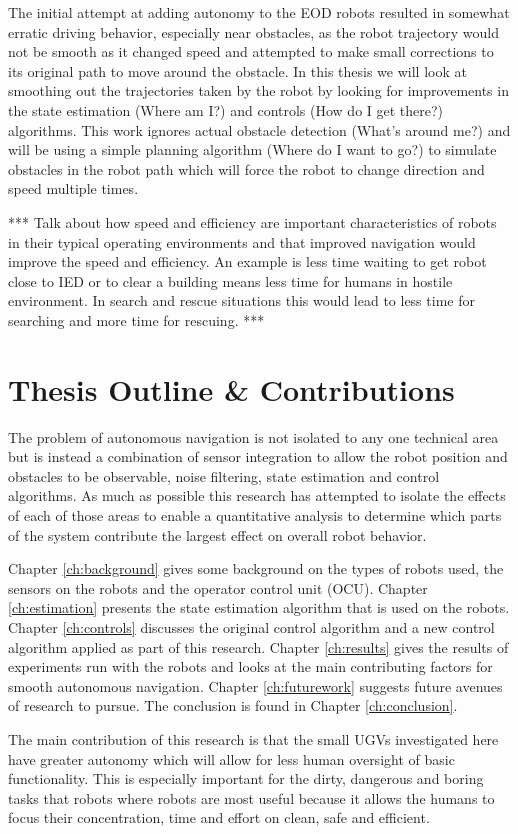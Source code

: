 The initial attempt at adding autonomy to the EOD robots resulted in somewhat erratic driving behavior, especially near obstacles, as the robot trajectory would not be smooth as it changed speed and attempted to make small corrections to its original path to move around the obstacle. In this thesis we will look at smoothing out the trajectories taken by the robot by looking for improvements in the state estimation (Where am I?) and controls (How do I get there?) algorithms. This work ignores actual obstacle detection (What's around me?) and will be using a simple planning algorithm (Where do I want to go?) to simulate obstacles in the robot path which will force the robot to change direction and speed multiple times.

*** Talk about how speed and efficiency are important characteristics of robots in their typical operating environments and that improved navigation would improve the speed and efficiency. An example is less time waiting to get robot close to IED or to clear a building means less time for humans in hostile environment. In search and rescue situations this would lead to less time for searching and more time for rescuing. ***

\section{Thesis Outline \& Contributions}
\label{sec:outline}
The problem of autonomous navigation is not isolated to any one technical area but is instead a combination of sensor integration to allow the robot position and obstacles to be observable, noise filtering, state estimation and control algorithms. As much as possible this research has attempted to isolate the effects of each of those areas to enable a quantitative analysis to determine which parts of the system contribute the largest effect on overall robot behavior.

Chapter \ref{ch:background} gives some background on the types of robots used, the sensors on the robots and the operator control unit (OCU). Chapter \ref{ch:estimation} presents the state estimation algorithm that is used on the robots. Chapter \ref{ch:controls} discusses the original control algorithm and a new control algorithm applied as part of this research. Chapter \ref{ch:results} gives the results of experiments run with the robots and looks at the main contributing factors for smooth autonomous navigation. Chapter \ref{ch:futurework} suggests future avenues of research to pursue. The conclusion is found in Chapter \ref{ch:conclusion}.

The main contribution of this research is that the small UGVs investigated here have greater autonomy which will allow for less human oversight of basic functionality. This is especially important for the dirty, dangerous and boring tasks that robots where robots are most useful because it allows the humans to focus their concentration, time and effort on clean, safe and efficient.